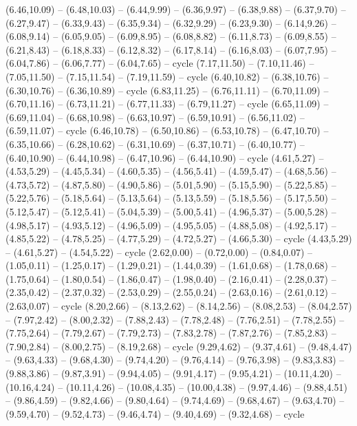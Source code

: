 {(6.46,10.09) -- (6.48,10.03) -- (6.44,9.99) -- (6.36,9.97) -- (6.38,9.88) -- (6.37,9.70) -- (6.27,9.47) -- (6.33,9.43) -- (6.35,9.34) -- (6.32,9.29) -- (6.23,9.30) -- (6.14,9.26) -- (6.08,9.14) -- (6.05,9.05) -- (6.09,8.95) -- (6.08,8.82) -- (6.11,8.73) -- (6.09,8.55) -- (6.21,8.43) -- (6.18,8.33) -- (6.12,8.32) -- (6.17,8.14) -- (6.16,8.03) -- (6.07,7.95) -- (6.04,7.86) -- (6.06,7.77) -- (6.04,7.65) -- cycle
  (7.17,11.50) -- (7.10,11.46) -- (7.05,11.50) -- (7.15,11.54) -- (7.19,11.59) -- cycle
  (6.40,10.82) -- (6.38,10.76) -- (6.30,10.76) -- (6.36,10.89) -- cycle
  (6.83,11.25) -- (6.76,11.11) -- (6.70,11.09) -- (6.70,11.16) -- (6.73,11.21) -- (6.77,11.33) -- (6.79,11.27) -- cycle
  (6.65,11.09) -- (6.69,11.04) -- (6.68,10.98) -- (6.63,10.97) -- (6.59,10.91) -- (6.56,11.02) -- (6.59,11.07) -- cycle
  (6.46,10.78) -- (6.50,10.86) -- (6.53,10.78) -- (6.47,10.70) -- (6.35,10.66) -- (6.28,10.62) -- (6.31,10.69) -- (6.37,10.71) -- (6.40,10.77) -- (6.40,10.90) -- (6.44,10.98) -- (6.47,10.96) -- (6.44,10.90) -- cycle}
\expandafter\def\csname geo:gebiet:NLD\endcsname{
  (4.61,5.27) -- (4.53,5.29) -- (4.45,5.34) -- (4.60,5.35) -- (4.56,5.41) -- (4.59,5.47) -- (4.68,5.56) -- (4.73,5.72) -- (4.87,5.80) -- (4.90,5.86) -- (5.01,5.90) -- (5.15,5.90) -- (5.22,5.85) -- (5.22,5.76) -- (5.18,5.64) -- (5.13,5.64) -- (5.13,5.59) -- (5.18,5.56) -- (5.17,5.50) -- (5.12,5.47) -- (5.12,5.41) -- (5.04,5.39) -- (5.00,5.41) -- (4.96,5.37) -- (5.00,5.28) -- (4.98,5.17) -- (4.93,5.12) -- (4.96,5.09) -- (4.95,5.05) -- (4.88,5.08) -- (4.92,5.17) -- (4.85,5.22) -- (4.78,5.25) -- (4.77,5.29) -- (4.72,5.27) -- (4.66,5.30) -- cycle
  (4.43,5.29) -- (4.61,5.27) -- (4.54,5.22) -- cycle}
\expandafter\def\csname geo:gebiet:MAR\endcsname{
  (2.62,0.00) -- (0.72,0.00) -- (0.84,0.07) -- (1.05,0.11) -- (1.25,0.17) -- (1.29,0.21) -- (1.44,0.39) -- (1.61,0.68) -- (1.78,0.68) -- (1.75,0.64) -- (1.80,0.54) -- (1.86,0.47) -- (1.98,0.40) -- (2.16,0.41) -- (2.28,0.37) -- (2.35,0.42) -- (2.37,0.32) -- (2.53,0.29) -- (2.55,0.24) -- (2.63,0.16) -- (2.61,0.12) -- (2.63,0.07) -- cycle}
\expandafter\def\csname geo:gebiet:MNE\endcsname{
  (8.20,2.66) -- (8.13,2.62) -- (8.14,2.56) -- (8.08,2.53) -- (8.04,2.57) -- (7.97,2.42) -- (8.00,2.32) -- (7.88,2.43) -- (7.78,2.48) -- (7.76,2.51) -- (7.78,2.55) -- (7.75,2.64) -- (7.79,2.67) -- (7.79,2.73) -- (7.83,2.78) -- (7.87,2.76) -- (7.85,2.83) -- (7.90,2.84) -- (8.00,2.75) -- (8.19,2.68) -- cycle}
\expandafter\def\csname geo:gebiet:MDA\endcsname{
  (9.29,4.62) -- (9.37,4.61) -- (9.48,4.47) -- (9.63,4.33) -- (9.68,4.30) -- (9.74,4.20) -- (9.76,4.14) -- (9.76,3.98) -- (9.83,3.83) -- (9.88,3.86) -- (9.87,3.91) -- (9.94,4.05) -- (9.91,4.17) -- (9.95,4.21) -- (10.11,4.20) -- (10.16,4.24) -- (10.11,4.26) -- (10.08,4.35) -- (10.00,4.38) -- (9.97,4.46) -- (9.88,4.51) -- (9.86,4.59) -- (9.82,4.66) -- (9.80,4.64) -- (9.74,4.69) -- (9.68,4.67) -- (9.63,4.70) -- (9.59,4.70) -- (9.52,4.73) -- (9.46,4.74) -- (9.40,4.69) -- (9.32,4.68) -- cycle}
